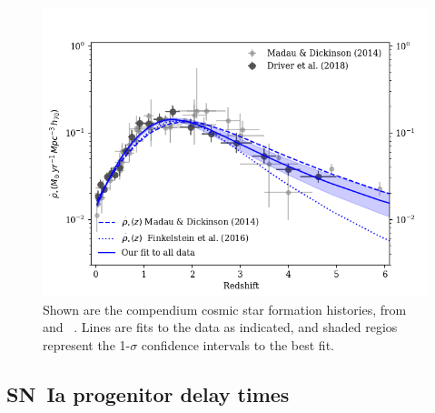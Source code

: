 \documentclass[apj]{aastex}
\begin{document}
\begin{figure}[t]
   \centering
   \includegraphics[width=6.1in]{figure_csfh_today}
   \caption{\footnotesize Shown are the compendium cosmic star formation histories, from ~\cite{Madau:2014fk} and ~\cite{Driver:2018nr}. Lines are fits to the data as indicated, and shaded regios represent the 1-$\sigma$ confidence intervals to the best fit.}%
   \label{fig:csfhs}
\end{figure}



\subsection{SN~Ia progenitor delay times}
\end{document}

